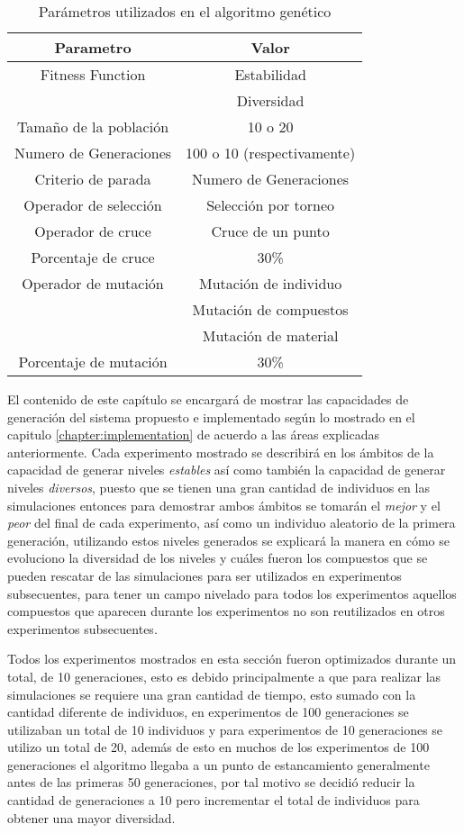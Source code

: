 \begin{table}[ht]
  \caption{Parámetros utilizados en el algoritmo genético}
  \label{table:parametros_ga}
  \centering
  \begin{tabular}{|c|c|}
  \hline
  Parametro & Valor \\
  \hline
  \hline
  Fitness Function & Estabilidad \\ & Diversidad \\
  \hline
  Tamaño de la población & 10 o 20 \\
  \hline
  Numero de Generaciones & 100 o 10 (respectivamente) \\
  \hline
  Criterio de parada & Numero de Generaciones \\
  \hline
  Operador de selección & Selección por torneo \\
  \hline
  Operador de cruce & Cruce de un punto \\
  \hline
  Porcentaje de cruce & 30\% \\
  \hline
  Operador de mutación & Mutación de individuo \\ & Mutación de compuestos \\ & Mutación de material \\
  \hline
  Porcentaje de mutación & 30\% \\
  \hline
  \end{tabular}
\end{table}

El contenido de este capítulo se encargará de mostrar las capacidades de
generación del sistema propuesto e implementado según lo mostrado en el capitulo
\ref{chapter:implementation} de acuerdo a las áreas explicadas anteriormente.
Cada experimento mostrado se describirá en los ámbitos de la capacidad de
generar niveles \textit{estables} así como también la capacidad de generar
niveles \textit{diversos}, puesto que se tienen una gran cantidad de individuos
en las simulaciones entonces para demostrar ambos ámbitos se tomarán el
\textit{mejor} y el \textit{peor} del final de cada experimento, así como un
individuo aleatorio de la primera generación, utilizando estos niveles generados
se explicará la manera en cómo se evoluciono la diversidad de los niveles y
cuáles fueron los compuestos que se pueden rescatar de las simulaciones para ser
utilizados en experimentos subsecuentes, para tener un campo nivelado para todos
los experimentos aquellos compuestos que aparecen durante los experimentos no
son reutilizados en otros experimentos subsecuentes.

Todos los experimentos mostrados en esta sección fueron optimizados durante un
total, de 10 generaciones, esto es debido principalmente a que para realizar las
simulaciones se requiere una gran cantidad de tiempo, esto sumado con la
cantidad diferente de individuos, en experimentos de 100 generaciones se
utilizaban un total de 10 individuos y para experimentos de 10 generaciones se
utilizo un total de 20, además de esto en muchos de los experimentos de 100
generaciones el algoritmo llegaba a un punto de estancamiento generalmente antes
de las primeras 50 generaciones, por tal motivo se decidió reducir la cantidad
de generaciones a 10 pero incrementar el total de individuos para obtener una
mayor diversidad.


